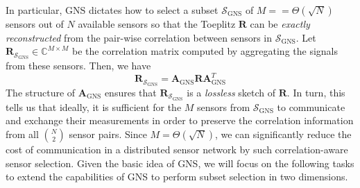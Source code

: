 In particular, GNS dictates how to select a subset $\mathcal{S}_{\text{GNS}}$ of $M =  = \Theta(\sqrt{N})$ sensors out of $N$ available sensors so that the Toeplitz $\mathbf{R}$ can be {\em exactly reconstructed} from the pair-wise correlation between sensors in $\mathcal{S}_{\text{GNS}}$. Let $\mathbf{R}_{\mathcal{S}_{\text{GNS}}} \in \mathbb{C}^{M\times M}$ be the correlation matrix computed by aggregating the signals from these sensors. Then, we have 
\begin{equation}
\mathbf{R}_{\mathcal{S}_{\text{GNS}}} = \mathbf{A}_{\text{GNS}} \mathbf{R} \mathbf{A}^T_{\text{GNS}} 
\end{equation}
The structure of $\mathbf{A}_{\text{GNS}}$ ensures that $\mathbf{R}_{\mathcal{S}_{\text{GNS}}}$ is a {\em lossless} sketch of  $\mathbf{R}$. In turn, this tells us that ideally, it is sufficient for the $M$ sensors from $\mathcal{S}_{\text{GNS}}$ to communicate and exchange their measurements in order to  preserve the correlation information from all $N\choose 2$ sensor pairs. Since $M = \Theta(\sqrt{N})$, we can significantly reduce the cost of communication in a distributed sensor network by such correlation-aware sensor selection. Given the basic idea of GNS, we will focus on the following tasks to extend the capabilities of GNS to perform subset selection in two dimensions.

